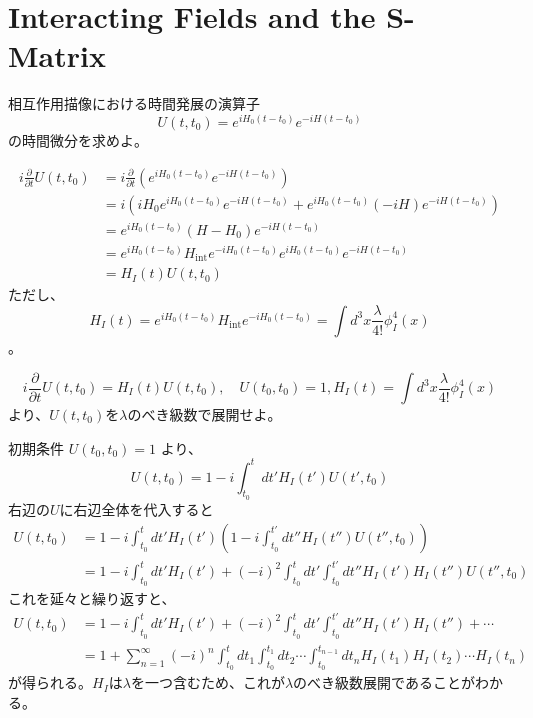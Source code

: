 
\section{Interacting Fields and the S-Matrix    }
\label{sec:interacting}

相互作用描像における時間発展の演算子
\[
    U(t, t_0) = e^{iH_0 (t - t_0)} e^{-iH(t-t_0)}
\]
の時間微分を求めよ。

\[
    \begin{aligned}
        i \frac{\partial}{\partial t} U(t, t_0)
         & = i \frac{\partial}{\partial t} \left( e^{iH_0 (t - t_0)} e^{-iH(t-t_0)} \right)                    \\
         & = i \left( iH_0 e^{iH_0 (t - t_0)} e^{-iH(t-t_0)} + e^{iH_0 (t - t_0)} (-iH) e^{-iH(t-t_0)} \right) \\
         & = e^{iH_0 (t - t_0)} (H - H_0) e^{-iH(t-t_0)}                                                       \\
         & = e^{iH_0 (t - t_0)} H_{\mathrm{int}} e^{- iH_0 (t - t_0)} e^{iH_0 (t - t_0)} e^{-iH(t-t_0)}        \\
         & = H_{I}(t) U(t, t_0)
    \end{aligned}
\]
ただし、
\[
    H_{I}(t) = e^{iH_0 (t - t_0)} H_{\mathrm{int}} e^{- iH_0 (t - t_0)}  = \int d^3 x \frac{\lambda}{4!} \phi_{I}^4(x)
\]。

\dotfill
\[
    i \frac{\partial}{\partial t} U(t, t_0) = H_{I}(t) U(t, t_0), \quad U(t_0, t_0) = 1, H_{I}(t) = \int d^3 x \frac{\lambda}{4!} \phi_{I}^4(x)
\]
より、\( U(t, t_0) \)を\(\lambda\)のべき級数で展開せよ。

初期条件 \( U(t_0, t_0) = 1 \) より、
\[
    U(t, t_0) = 1 - i\int_{t_0}^{t} dt' H_{I}(t') U(t', t_0)
\]
右辺の\(U\)に右辺全体を代入すると
\[
    \begin{aligned}
         U(t, t_0) 
         & = 1 - i\int_{t_0}^{t} dt' H_{I}(t') \left( 1 - i\int_{t_0}^{t'} dt'' H_{I}(t'') U(t'', t_0) \right) \\
         & = 1 - i\int_{t_0}^{t} dt' H_{I}(t') + (-i)^2 \int_{t_0}^{t} dt' \int_{t_0}^{t'} dt'' H_{I}(t') H_{I}(t'') U(t'', t_0)
    \end{aligned}
\]
これを延々と繰り返すと、
\[
    \begin{aligned}
         U(t, t_0) 
         & = 1 - i\int_{t_0}^{t} dt' H_{I}(t') + (-i)^2 \int_{t_0}^{t} dt' \int_{t_0}^{t'} dt'' H_{I}(t') H_{I}(t'') + \cdots \\
         & = 1 + \sum_{n=1}^{\infty} (-i)^n \int_{t_0}^{t} dt_1 \int_{t_0}^{t_1} dt_2 \cdots \int_{t_0}^{t_{n-1}} dt_n H_{I}(t_1) H_{I}(t_2) \cdots H_{I}(t_n)
    \end{aligned}
\]
が得られる。\(H_I\)は\(\lambda\)を一つ含むため、これが\(\lambda\)のべき級数展開であることがわかる。

